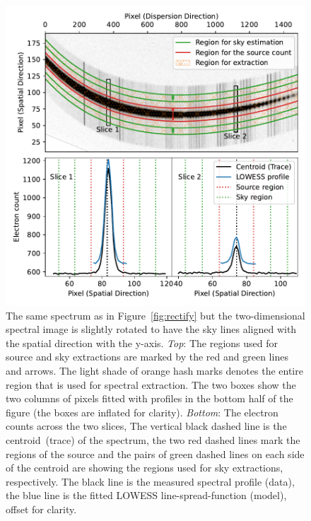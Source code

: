 \documentclass[linenumbers, twocolumn]{aastex631}
\begin{document}
\begin{figure}
    \centering
    \includegraphics[width=\columnwidth]{fig_03_extraction_profile.pdf}
    \caption{The same spectrum as in Figure~\ref{fig:rectify} but the
    two-dimensional spectral image is slightly rotated to have the sky lines
    aligned with the spatial direction with the y-axis.
    \textit{Top}: The regions used for source and sky extractions are marked
    by the red and green lines and arrows. The light shade of orange
    hash marks denotes the entire region that is used for spectral extraction.
    The two boxes show the two columns of pixels fitted with
    profiles in the bottom half of the figure (the boxes are inflated
    for clarity). \textit{Bottom}: The electron counts across the two slices,
    The vertical black dashed line is the centroid~(trace) of the spectrum,
    the two red dashed lines mark the regions of the source and the
    pairs of green dashed lines on each side of the centroid are
    showing the regions used for sky extractions, respectively. The
    black line is the measured spectral profile (data), the blue
    line is the fitted LOWESS line-spread-function (model), offset for
    clarity.}
    \label{fig:extraction}
\end{figure}

\end{document}
